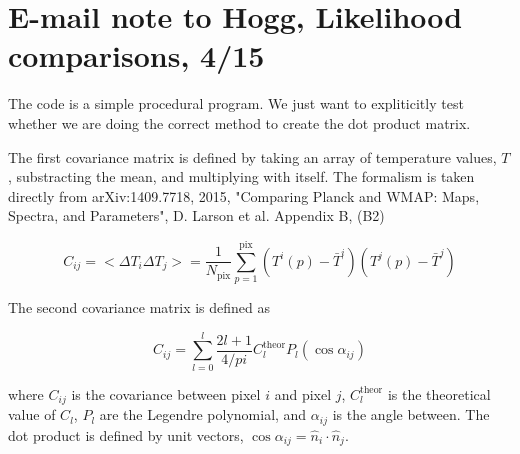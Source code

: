 \documentclass[a4paper, 11pt]{article}
\begin{document}

\section*{E-mail note to Hogg, Likelihood comparisons, 4/15}

The code is a simple procedural program. We just want to expliticitly test whether we are doing the correct method to create the dot product matrix. 

The first covariance matrix is defined by taking an array of temperature values, $T$, substracting the mean, and multiplying with itself. The formalism is taken directly from arXiv:1409.7718, 2015, "Comparing Planck and WMAP: Maps, Spectra, and Parameters", D. Larson et al. Appendix B, (B2)

$$
C_{ij} = <\Delta T_i \Delta T_j > = \frac{1}{N_{\text{pix}}} \sum^{\text{pix}}_{p=1} (T^i(p)-\bar{T}^i) (T^j(p)-\bar{T}^j)
$$






The second covariance matrix is defined as 

$$
C_{ij}=\sum^{l}_{l=0} \frac{2l+1}{4/pi} C^{\text{theor}}_{l}P_{l}(\cos\alpha_{ij})
$$

where $C_{ij}$ is the covariance between pixel $i$ and pixel $j$,  $C^{\text{theor}}_{l}$ is the theoretical value of $C_l$, $P_{l}$  are the Legendre polynomial, and $\alpha_{ij}$ is the angle between. The dot product is defined by unit vectors, $\cos\alpha_{ij}=\hat{n}_{i}\cdot\hat{n}_{j}$. 
\end{document}
